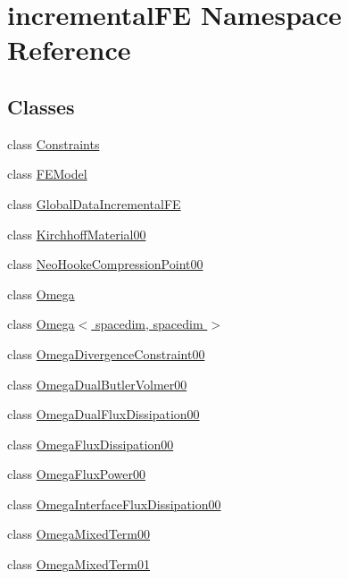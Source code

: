 \hypertarget{namespaceincremental_f_e}{}\section{incremental\+FE Namespace Reference}
\label{namespaceincremental_f_e}
\subsection*{Classes}
\begin{DoxyCompactItemize}
\item 
class \hyperlink{classincremental_f_e_1_1_constraints}{Constraints}
\item 
class \hyperlink{classincremental_f_e_1_1_f_e_model}{F\+E\+Model}
\item 
class \hyperlink{classincremental_f_e_1_1_global_data_incremental_f_e}{Global\+Data\+Incremental\+FE}
\item 
class \hyperlink{classincremental_f_e_1_1_kirchhoff_material00}{Kirchhoff\+Material00}
\item 
class \hyperlink{classincremental_f_e_1_1_neo_hooke_compression_point00}{Neo\+Hooke\+Compression\+Point00}
\item 
class \hyperlink{classincremental_f_e_1_1_omega}{Omega}
\item 
class \hyperlink{classincremental_f_e_1_1_omega_3_01spacedim_00_01spacedim_01_4}{Omega$<$ spacedim, spacedim $>$}
\item 
class \hyperlink{classincremental_f_e_1_1_omega_divergence_constraint00}{Omega\+Divergence\+Constraint00}
\item 
class \hyperlink{classincremental_f_e_1_1_omega_dual_butler_volmer00}{Omega\+Dual\+Butler\+Volmer00}
\item 
class \hyperlink{classincremental_f_e_1_1_omega_dual_flux_dissipation00}{Omega\+Dual\+Flux\+Dissipation00}
\item 
class \hyperlink{classincremental_f_e_1_1_omega_flux_dissipation00}{Omega\+Flux\+Dissipation00}
\item 
class \hyperlink{classincremental_f_e_1_1_omega_flux_power00}{Omega\+Flux\+Power00}
\item 
class \hyperlink{classincremental_f_e_1_1_omega_interface_flux_dissipation00}{Omega\+Interface\+Flux\+Dissipation00}
\item 
class \hyperlink{classincremental_f_e_1_1_omega_mixed_term00}{Omega\+Mixed\+Term00}
\item 
class \hyperlink{classincremental_f_e_1_1_omega_mixed_term01}{Omega\+Mixed\+Term01}

\end{DoxyCompactItemize}
